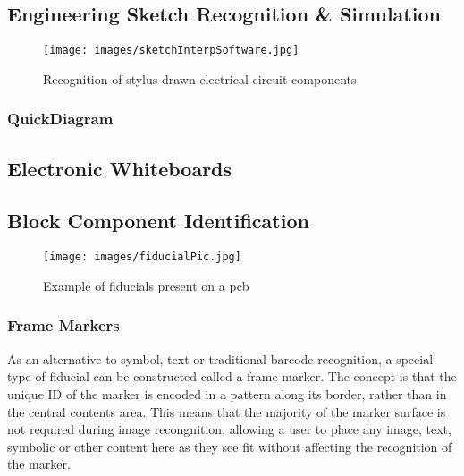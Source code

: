 \subsection{Engineering Sketch Recognition \& Simulation}


\begin{figure}[ht!]
\centering
\texttt{[image: images/sketchInterpSoftware.jpg]}
\caption{Recognition of stylus-drawn electrical circuit components \cite{sketchInterpSoftware}}
\label{im:sketchInterpSoftware}
\end{figure}

\clearpage

\subsubsection{QuickDiagram}



\subsection{Electronic Whiteboards}



\subsection{Block Component Identification}




\begin{figure}[ht!]
\centering
\texttt{[image: images/fiducialPic.jpg]}
\caption{Example of fiducials present on a \gls{pcb} \cite{fiducialPic}}
\label{im:fiducialPic}
\end{figure}

\clearpage



\subsubsection{Frame Markers}
\label{ch:back:borders}

As an alternative to symbol, text or traditional barcode recognition, a special type of fiducial can be constructed called a frame marker. The concept is that the unique ID of the marker is encoded in a pattern along its border, rather than in the central contents area. This means that the majority of the marker surface is not required during image recongnition, allowing a user to place any image, text, symbolic or other content here as they see fit without affecting the recognition of the marker.

